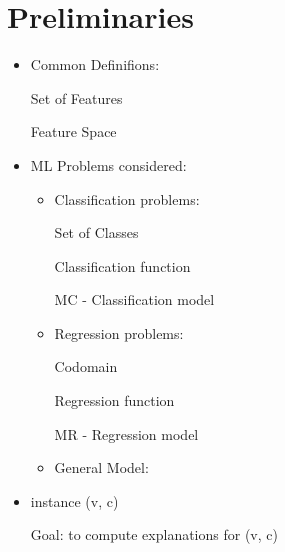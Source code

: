 \section{Preliminaries} \label{sec:prelim}

\begin{itemize}
\item Common Definifions:

Set of Features

Feature Space

\item ML Problems considered:
\begin{itemize}
\item Classification problems:

Set of Classes

Classification function

MC -  Classification model

\item Regression problems:

Codomain

Regression function

MR - Regression model

\item General Model:
\end{itemize}

\item instance (v, c)

Goal: to compute explanations for (v, c)

\end{itemize}
